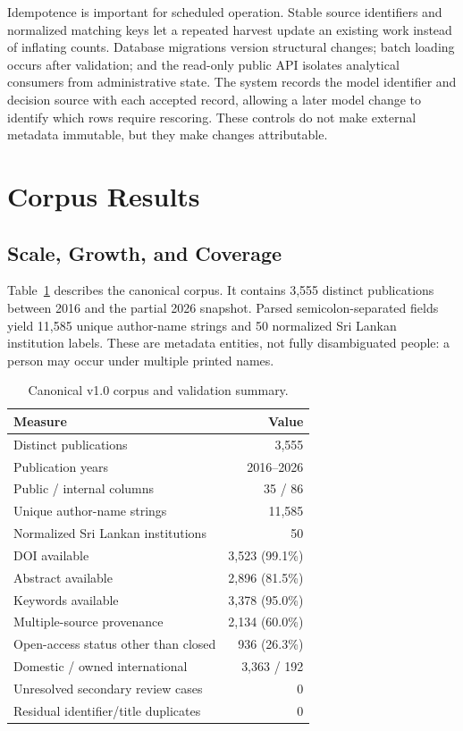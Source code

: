 \documentclass[conference]{IEEEtran}
\begin{document}
Idempotence is important for scheduled operation. Stable source identifiers and normalized matching keys let a repeated harvest update an existing work instead of inflating counts. Database migrations version structural changes; batch loading occurs after validation; and the read-only public API isolates analytical consumers from administrative state. The system records the model identifier and decision source with each accepted record, allowing a later model change to identify which rows require rescoring. These controls do not make external metadata immutable, but they make changes attributable.

\section{Corpus Results}
\subsection{Scale, Growth, and Coverage}
Table~\ref{tab:quality} describes the canonical corpus. It contains 3,555 distinct publications between 2016 and the partial 2026 snapshot. Parsed semicolon-separated fields yield 11,585 unique author-name strings and 50 normalized Sri Lankan institution labels. These are metadata entities, not fully disambiguated people: a person may occur under multiple printed names.

\begin{table}[t]
\caption{Canonical v1.0 corpus and validation summary.}
\label{tab:quality}
\centering
\small
\begin{tabular}{lr}
\toprule
Measure & Value \\
\midrule
Distinct publications & 3,555 \\
Publication years & 2016--2026 \\
Public / internal columns & 35 / 86 \\
Unique author-name strings & 11,585 \\
Normalized Sri Lankan institutions & 50 \\
DOI available & 3,523 (99.1\%) \\
Abstract available & 2,896 (81.5\%) \\
Keywords available & 3,378 (95.0\%) \\
Multiple-source provenance & 2,134 (60.0\%) \\
Open-access status other than closed & 936 (26.3\%) \\
Domestic / owned international & 3,363 / 192 \\
Unresolved secondary review cases & 0 \\
Residual identifier/title duplicates & 0 \\
\bottomrule
\end{tabular}
\end{table}
\end{document}
